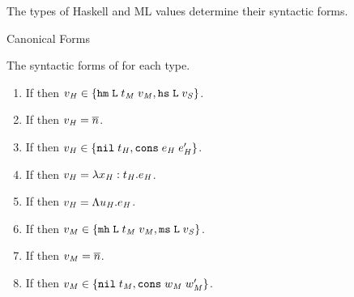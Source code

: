 The types of Haskell and ML values determine their syntactic forms.

\begin{lemma}{Canonical Forms}

\label{lemcan}

The syntactic forms of \profvs for each type.

\begin{enumerate}



\item If \judeh{\env}{\varvalfh}{\tylump} then $v_{\mathit{H}} \in \lbrace \mathtt{hm} \; \mathtt{L} \; t_{\mathit{M}} \; v_{\mathit{M}}, \mathtt{hs} \; \mathtt{L} \; v_{\mathit{S}} \rbrace$.


\item If \judeh{\env}{\varvalfh}{\tynum} then $v_{\mathit{H}} = \overline{n}$.


\item If \judeh{\env}{\varvalfh}{\tylist{\vartyh}} then $v_{\mathit{H}} \in \lbrace \mathtt{nil} \; t_{\mathit{H}}, \mathtt{cons} \; e_{\mathit{H}} \; e_{\mathit{H}}' \rbrace$.


\item If \judeh{\env}{\varvalfh}{\tyfun{\first{\vartyh}}{\second{\vartyh}}} then $v_{\mathit{H}} = \lambda x_{\mathit{H}} : t_{\mathit{H}} . e_{\mathit{H}}$.


\item If \judeh{\env}{\varvalfh}{\tyfor{\tyvarh}{\vartyh}} then $v_{\mathit{H}} = \Lambda u_{\mathit{H}} . e_{\mathit{H}}$.



\item If \judem{\env}{\varvalfm}{\tylump} then $v_{\mathit{M}} \in \lbrace \mathtt{mh} \; \mathtt{L} \; t_{\mathit{M}} \; v_{\mathit{M}}, \mathtt{ms} \; \mathtt{L} \; v_{\mathit{S}} \rbrace$.


\item If \judem{\env}{\varvalfm}{\tynum} then $v_{\mathit{M}} = \overline{n}$.


\item If \judem{\env}{\varvalfm}{\tylist{\vartym}} then $v_{\mathit{M}} \in \lbrace \mathtt{nil} \; t_{\mathit{M}}, \mathtt{cons} \; w_{\mathit{M}} \; w_{\mathit{M}}' \rbrace$.



\end{enumerate}
\end{lemma}
